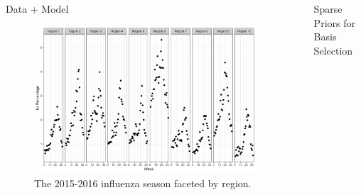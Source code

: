 \documentclass[final]{beamer}
\newlength{\sepwid}
\newlength{\onecolwid}
\newlength{\twocolwid}
\begin{document}
\begin{frame}[t]
\begin{columns}[t]
\begin{column}{\onecolwid}
\begin{block}{Data + Model}
\end{block}


\begin{figure}
\includegraphics[width=\linewidth]{plots/ILI.png}
\caption{The 2015-2016 influenza season faceted by region.}
\end{figure}


\end{column} %

\begin{column}{\sepwid}\end{column} %

\begin{column}{\twocolwid} %

\begin{columns}[t,totalwidth=\twocolwid] %

\begin{column}{\onecolwid}\vspace{-.6in} %


\begin{block}{Sparse Priors for Basis Selection}


\end{block}
\end{column}
\end{columns}
\end{column}
\end{columns}
\end{frame}
\end{document}
